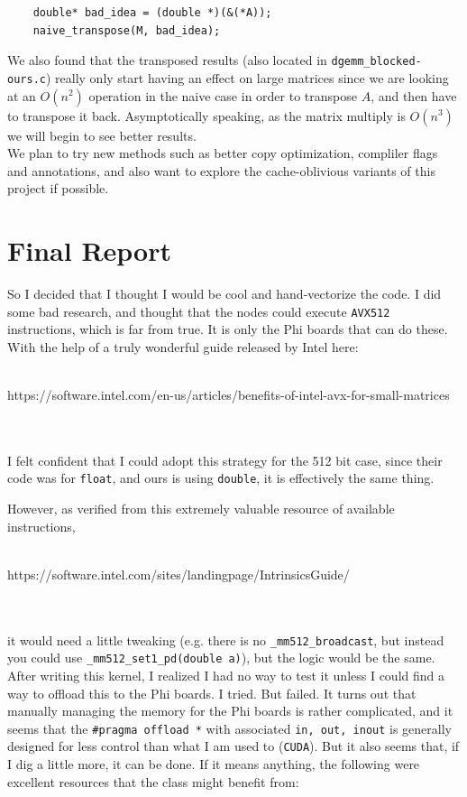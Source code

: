 \documentclass[11pt]{article}
\begin{document}
\begin{lstlisting}
    double* bad_idea = (double *)(&(*A));
    naive_transpose(M, bad_idea);
\end{lstlisting}

\noindent We also found that the transposed results (also located in \texttt{dgemm\_blocked-ours.c}) really only start having an effect on large matrices since we are looking at an $O(n^2)$ operation in the naive case in order to transpose $A$, and then have to transpose it back.  Asymptotically speaking, as the matrix multiply is $O(n^3)$ we will begin to see better results.\\

\noindent We plan to try new methods such as better copy optimization, compliler flags and annotations, and also want to explore the cache-oblivious variants of this project if possible.

\section{Final Report}

\noindent So I decided that I thought I would be cool and hand-vectorize the code.  I did some bad research, and thought that the nodes could execute \texttt{AVX512} instructions, which is far from true.  It is only the Phi boards that can do these.  With the help of a truly wonderful guide released by Intel here: \\\\\centerline{https://software.intel.com/en-us/articles/benefits-of-intel-avx-for-small-matrices}\\\\ I felt confident that I could adopt this strategy for the 512 bit case, since their code was for \texttt{float}, and ours is using \texttt{double}, it is effectively the same thing.

\noindent However, as verified from this extremely valuable resource of available instructions, \\\\\centerline{https://software.intel.com/sites/landingpage/IntrinsicsGuide/}\\\\ it would need a little tweaking (e.g. there is no \texttt{\_mm512\_broadcast}, but instead you could use \texttt{\_mm512\_set1\_pd(double a)}), but the logic would be the same.  After writing this kernel, I realized I had no way to test it unless I could find a way to offload this to the Phi boards.  I tried.  But failed.  It turns out that manually managing the memory for the Phi boards is rather complicated, and it seems that the \texttt{\#pragma offload *} with associated \texttt{in, out, inout} is generally designed for less control than what I am used to (\texttt{CUDA}).  But it also seems that, if I dig a little more, it can be done.  If it means anything, the following were excellent resources that the class might benefit from:
\end{document}
